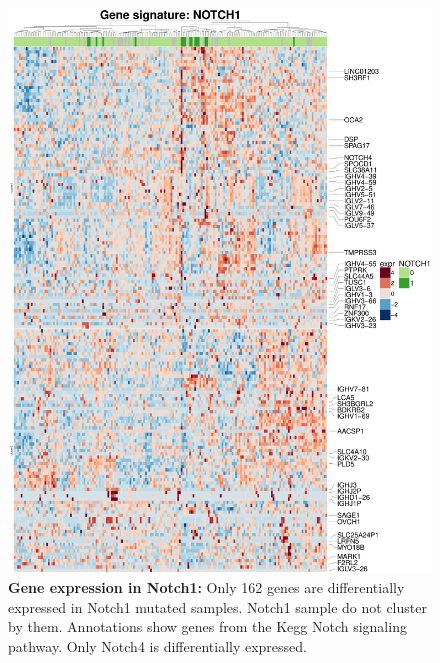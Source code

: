 \begin{figure}
	\centering
	\includegraphics[width=\columnwidth]{./Figures/gene_exprNOTCH1_gsea_Hallmark.pdf}
	\caption{\textbf{Gene expression in Notch1:} Only 162 genes are differentially expressed in Notch1 mutated samples. Notch1 sample do not cluster by them. Annotations show genes from the Kegg Notch signaling pathway. Only Notch4 is differentially expressed.}
	\label{fig:gene_exprNOTCH1_gsea_Hallmark}
\end{figure}

